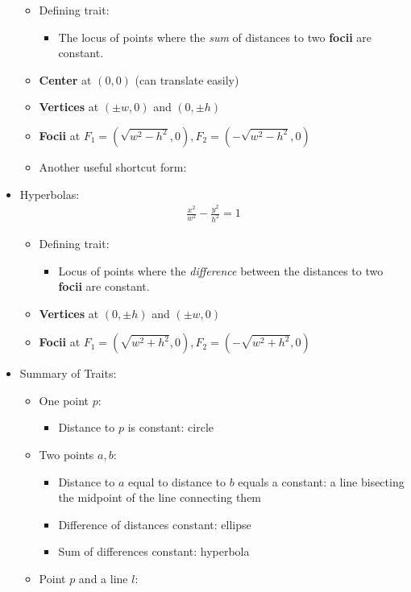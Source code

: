 \begin{itemize}
  \begin{itemize}
  \tightlist
  \item
    Defining trait:

    \begin{itemize}
    \tightlist
    \item
      The locus of points where the \emph{sum} of distances to two
      \textbf{focii} are constant.
    \end{itemize}
  \item
    \textbf{Center} at \((0,0)\) (can translate easily)
  \item
    \textbf{Vertices} at \((\pm w, 0)\) and \((0, \pm h)\)
  \item
    \textbf{Focii} at
    \(F_1 = (\sqrt{w^2-h^2}, 0), F_2 = (-\sqrt{w^2-h^2}, 0)\)
  \item
    Another useful shortcut form:
  \end{itemize}
\item
  Hyperbolas:
  \begin{align*}\frac{x^2}{w^2}-\frac{y^2}{h^2} = 1\end{align*}

  \begin{itemize}
  \tightlist
  \item
    Defining trait:

    \begin{itemize}
    \tightlist
    \item
      Locus of points where the \emph{difference} between the distances
      to two \textbf{focii} are constant.
    \end{itemize}
  \item
    \textbf{Vertices} at \((0, \pm h)\) and \((\pm w, 0)\)
  \item
    \textbf{Focii} at
    \(F_1 = (\sqrt{w^2+h^2}, 0), F_2 = (-\sqrt{w^2+h^2}, 0)\)
  \end{itemize}
\item
  Summary of Traits:

  \begin{itemize}
  \tightlist
  \item
    One point \(p\):

    \begin{itemize}
    \tightlist
    \item
      Distance to \(p\) is constant: circle
    \end{itemize}
  \item
    Two points \(a,b\):

    \begin{itemize}
    \tightlist
    \item
      Distance to \(a\) equal to distance to \(b\) equals a constant: a
      line bisecting the midpoint of the line connecting them
    \item
      Difference of distances constant: ellipse
    \item
      Sum of differences constant: hyperbola
    \end{itemize}
  \item
    Point \(p\) and a line \(l\):


\end{itemize}
\end{itemize}
